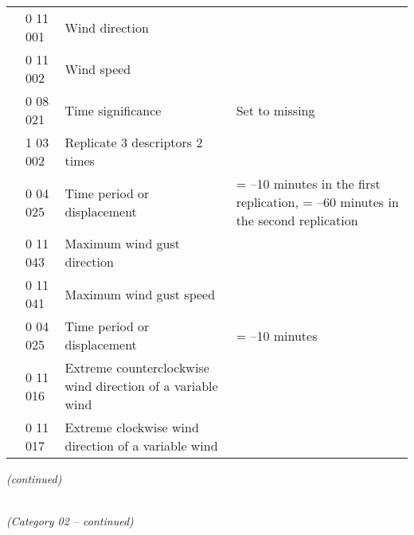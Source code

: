 \begin{longtable}[]{@{}llll@{}}
& 0 11 001 & Wind direction &\tabularnewline
& 0 11 002 & Wind speed &\tabularnewline
& 0 08 021 & Time significance & Set to missing\tabularnewline
& 1 03 002 & Replicate 3 descriptors 2 times &\tabularnewline
& 0 04 025 & Time period or displacement & = --10 minutes in the first replication, = --60 minutes in the second replication\tabularnewline
& 0 11 043 & Maximum wind gust direction &\tabularnewline
& 0 11 041 & Maximum wind gust speed &\tabularnewline
& 0 04 025 & Time period or displacement & = --10 minutes\tabularnewline
& 0 11 016 & Extreme counterclockwise wind direction of a variable wind &\tabularnewline
& 0 11 017 & Extreme clockwise wind direction of a variable wind &\tabularnewline
\bottomrule
\end{longtable}

\emph{(continued)}

\emph{\\
(Category 02 -- continued)}

